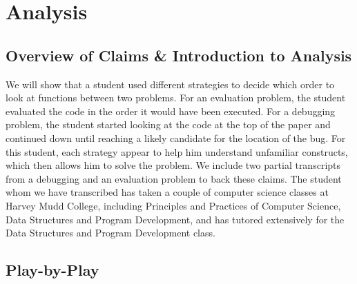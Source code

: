 \section{Analysis}
\subsection{Overview of Claims \& Introduction to Analysis}

We will show that a student used different strategies to decide which order to look at functions between two problems.
For an evaluation problem, the student evaluated the code in the order it would have been executed.
For a debugging problem, the student started looking at the code at the top of the paper and continued down until reaching a likely candidate for the location of the bug.
For this student, each strategy appear to help him understand unfamiliar constructs, which then allows him to solve the problem. 
We include two partial transcripts from a debugging and an evaluation problem to back these claims. 
The student whom we have transcribed has taken a couple of computer science classes at Harvey Mudd College, including Principles and Practices of Computer Science, Data Structures and Program Development, and has tutored extensively for the Data Structures and Program Development class. 

\subsection{Play-by-Play}

